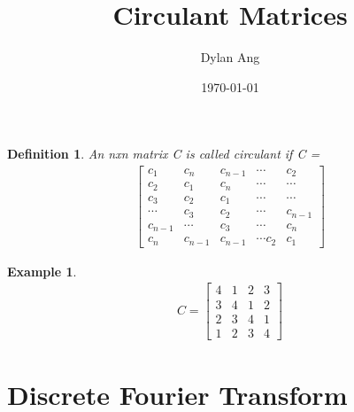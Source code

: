 \documentclass[12pt]{amsart}
\title{Circulant Matrices}
\author{Dylan Ang}
\date{\today}
\newtheorem{definition}{Definition} %
\newtheorem*{example}{Example}      %
\numberwithin{equation}{theorem}    %
\begin{document}
\maketitle

\begin{definition}
    An nxn matrix C is called circulant if C =
    \begin{align*}
        \begin{bmatrix}
            c_1     & c_n     & c_{n-1} & \cdots     & c_2     \\
            c_2     & c_1     & c_n     & \cdots     & \cdots  \\
            c_3     & c_2     & c_1     & \cdots     & \cdots  \\
            \cdots  & c_3     & c_2     & \cdots     & c_{n-1} \\
            c_{n-1} & \cdots  & c_3     & \cdots     & c_n     \\
            c_n     & c_{n-1} & c_{n-1} & \cdots c_2 & c_1
        \end{bmatrix}
    \end{align*}
\end{definition}

\begin{example}
    \begin{align*}
        C = \begin{bmatrix}
            4 & 1 & 2 & 3 \\
            3 & 4 & 1 & 2 \\
            2 & 3 & 4 & 1 \\
            1 & 2 & 3 & 4
        \end{bmatrix}
    \end{align*}
\end{example}

\section{Discrete Fourier Transform}
\end{document}
